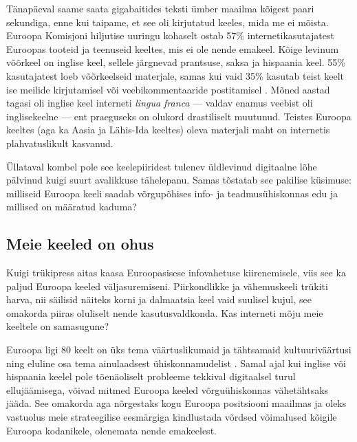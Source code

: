 \documentclass[]{../metanetpaper}
\begin{document}
\begin{multicols}{2}
Tänapäeval saame saata gigabaitides teks\-ti ümber maailma kõigest paari sekundiga, enne kui taipame, et see oli kirjutatud keeles, mida me ei mõista. 
Euroopa Komisjoni hiljutise uuringu kohaselt ostab 57\% internetikasutajatest Euroopas tooteid ja teenuseid keeltes, mis ei ole nende emakeel. 
Kõige levinum võõrkeel on inglise keel, sellele järgnevad prantsuse, saksa ja hispaania keel. 
55\% kasuta\-ja\-test loeb võõrkeelseid materjale, samas kui vaid 35\% kasutab teist keelt ise meilide kirjutamisel või veebikommentaaride postitamisel \cite{EC1}. 
Mõned aastad tagasi oli ing\-lise keel interneti \textit{lingua franca} --- valdav enamus veebist oli inglisekeelne --- ent praeguseks on olukord drastiliselt muutunud. 
Teistes Euroopa keeltes (aga ka Aasia ja Lähis-Ida keeltes) oleva materjali maht on internetis plahvatuslikult kasvanud. 

Üllataval kombel pole see keelepiiridest tulenev üldlevinud digitaalne lõhe pälvinud kuigi suurt avalikkuse tähelepanu. 
Samas tõstatab see pakilise küsimuse: milliseid Euroopa keeli saadab võrgupõhises info- ja teadmusühiskonnas edu ja millised on määratud kaduma?

\subsection{Meie keeled on ohus}

Kuigi trükipress aitas kaasa Euroopa\-sisese infovahetuse kiirenemisele, viis see ka paljud Euroopa keeled väljasuremiseni. 
Piirkondlikke ja vähemuskeeli trükiti harva, nii säilisid näiteks korni ja dalmaatsia keel vaid suulisel kujul, see omakorda piiras oluliselt nende kasutusvaldkonda. 
Kas interneti mõju meie keeltele on samasugune?

Euroopa ligi 80 keelt on üks tema väärtuslikumaid ja tähtsamaid kultuuriväärtusi ning eluline osa tema ainulaadsest ühiskonna\-mudelist \cite{EC2}. 
Samal ajal kui ing\-lise või hispaania keelel pole tõenäoliselt probleeme tekkival digitaalsel turul ellujäämisega, võivad mitmed Euroopa keeled võrguühiskonnas vähetähtsaks jääda. 
See omakorda aga nõrgestaks kogu Euroopa positsiooni maailmas ja oleks vastuolus meie strateegilise eesmärgiga kindlustada võrdsed võimalused kõigile Euroopa kodanikele, olenemata nende emakeelest. 





\end{multicols}
\end{document}
